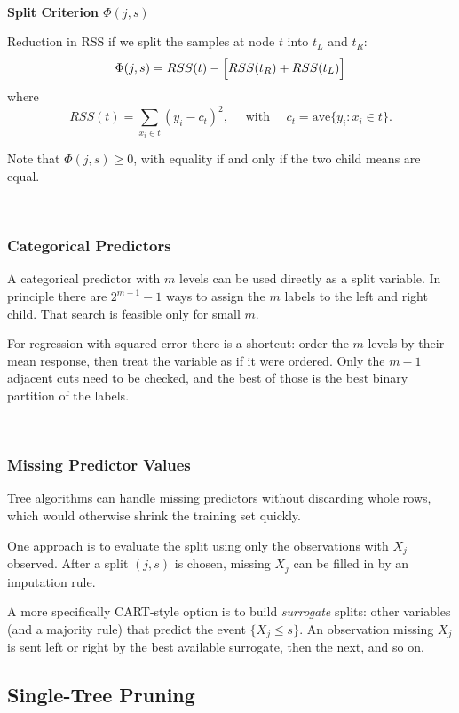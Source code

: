 \documentclass[
]{book}
\begin{document}
~

\textbf{Split Criterion \(\Phi(j, s)\)}

Reduction in RSS if we split the samples at node \(t\) into \(t_L\) and \(t_R\):
\[ \Phi(j, s) = RSS(t) - \Bigl[RSS(t_R) + RSS(t_L) \Bigr] \]
where
\[RSS(t) = \sum_{x_i \in t} (y_i - c_t)^2, \quad \text{ with } \quad c_t = \mathrm{ave}\{y_i : x_i \in t\}.\]

Note that \(\Phi(j, s) \ge 0\), with equality if and only if the two child means are equal.

~

\subsubsection*{Categorical Predictors}\label{categorical-predictors}

A categorical predictor with \(m\) levels can be used directly as a split variable. In principle there are \(2^{m-1}-1\) ways to assign the \(m\) labels to the left and right child. That search is feasible only for small \(m\).

For regression with squared error there is a shortcut: order the \(m\) levels by their mean response, then treat the variable as if it were ordered. Only the \(m-1\) adjacent cuts need to be checked, and the best of those is the best binary partition of the labels.

~

\subsubsection*{Missing Predictor Values}\label{missing-predictor-values}

Tree algorithms can handle missing predictors without discarding whole rows, which would otherwise shrink the training set quickly.

One approach is to evaluate the split using only the observations with \(X_j\) observed. After a split \((j,s)\) is chosen, missing \(X_j\) can be filled in by an imputation rule.

A more specifically CART-style option is to build \emph{surrogate} splits: other variables (and a majority rule) that predict the event \(\{X_j \le s\}\). An observation missing \(X_j\) is sent left or right by the best available surrogate, then the next, and so on.

\subsection{Single-Tree Pruning}\label{single-tree-pruning}
\end{document}
